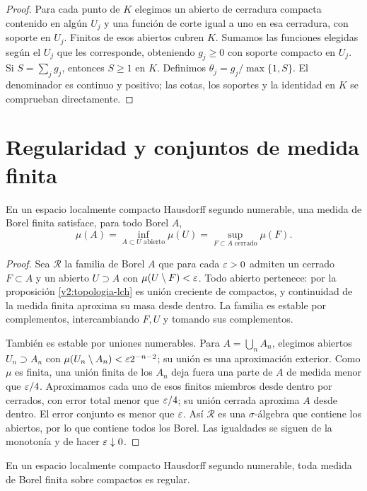 \begin{proof}
Para cada punto de $K$ elegimos un abierto de cerradura compacta contenido en algún $U_j$ y una función de corte igual a uno en esa cerradura, con soporte en $U_j$. Finitos de esos abiertos cubren $K$. Sumamos las funciones elegidas según el $U_j$ que les corresponde, obteniendo $g_j\ge0$ con soporte compacto en $U_j$. Si $S=\sum_jg_j$, entonces $S\ge1$ en $K$. Definimos $\theta_j=g_j/\max\{1,S\}$. El denominador es continuo y positivo; las cotas, los soportes y la identidad en $K$ se comprueban directamente.
\end{proof}

\section{Regularidad y conjuntos de medida finita}
\begin{lema}\label{v2:borel-finita-regular}
En un espacio localmente compacto Hausdorff segundo numerable, una medida de Borel finita satisface, para todo Borel $A$,
\[
 \mu(A)=\inf_{A\subset U\text{ abierto}}\mu(U)
 =\sup_{F\subset A\text{ cerrado}}\mu(F).
\]
\end{lema}
\begin{proof}
Sea $\mathcal R$ la familia de Borel $A$ que para cada $\varepsilon>0$ admiten un cerrado $F\subset A$ y un abierto $U\supset A$ con $\mu(U\setminus F)<\varepsilon$. Todo abierto pertenece: por la proposición \ref{v2:topologia-lch} es unión creciente de compactos, y continuidad de la medida finita aproxima su masa desde dentro. La familia es estable por complementos, intercambiando $F,U$ y tomando sus complementos.

También es estable por uniones numerables. Para $A=\bigcup_nA_n$, elegimos abiertos $U_n\supset A_n$ con $\mu(U_n\setminus A_n)<\varepsilon2^{-n-2}$; su unión es una aproximación exterior. Como $\mu$ es finita, una unión finita de los $A_n$ deja fuera una parte de $A$ de medida menor que $\varepsilon/4$. Aproximamos cada uno de esos finitos miembros desde dentro por cerrados, con error total menor que $\varepsilon/4$; su unión cerrada aproxima $A$ desde dentro. El error conjunto es menor que $\varepsilon$. Así $\mathcal R$ es una $\sigma$-álgebra que contiene los abiertos, por lo que contiene todos los Borel. Las igualdades se siguen de la monotonía y de hacer $\varepsilon\downarrow0$.
\end{proof}
\begin{teorema}\label{v2:borel-localmente-finita}
En un espacio localmente compacto Hausdorff segundo numerable, toda medida de Borel finita sobre compactos es regular.
\end{teorema}
